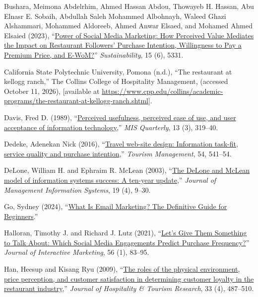\documentclass[
  12pt,
  letterpaper,
  DIV=11,
  numbers=noendperiod]{scrartcl}
\newlength{\cslhangindent}
\newenvironment{CSLReferences}[2] %
 {\begin{list}{}{%
  \setlength{\itemindent}{0pt}
  \setlength{\leftmargin}{0pt}
  \setlength{\parsep}{0pt}
  \ifodd #1
   \setlength{\leftmargin}{\cslhangindent}
   \setlength{\itemindent}{-1\cslhangindent}
  \fi
  \setlength{\itemsep}{#2\baselineskip}}}
 {\end{list}}
\begin{document}
\begin{CSLReferences}{1}{0}
Bushara, Meimona Abdelrhim, Ahmed Hassan Abdou, Thowayeb H. Hassan, Abu
Elnasr E. Sobaih, Abdullah Saleh Mohammed Albohnayh, Waleed Ghazi
Alshammari, Mohammed Aldoreeb, Ahmed Anwar Elsaed, and Mohamed Ahmed
Elsaied (2023), {``\href{https://doi.org/10.3390/su15065331}{Power of
Social Media Marketing: How Perceived Value Mediates the Impact on
Restaurant Followers{'} Purchase Intention, Willingness to Pay a Premium
Price, and E-WoM?}''} \emph{Sustainability}, 15 (6), 5331.

California State Polytechnic University, Pomona (n.d.), {``The
restaurant at kellogg ranch,''} The Collins College of Hospitality
Management, (accessed October 11, 2026), {[}available at
\url{https://www.cpp.edu/collins/academic-programs/the-restaurant-at-kellogg-ranch.shtml}{]}.

Davis, Fred D. (1989),
{``\href{https://doi.org/10.2307/249008}{Perceived usefulness, perceived
ease of use, and user acceptance of information technology},''}
\emph{MIS Quarterly}, 13 (3), 319--40.

Dedeke, Adenekan Nick (2016),
{``\href{https://doi.org/10.1016/j.tourman.2016.01.001}{Travel web-site
design: Information task-fit, service quality and purchase
intention},''} \emph{Tourism Management}, 54, 541--54.

DeLone, William H. and Ephraim R. McLean (2003),
{``\href{https://doi.org/10.1080/07421222.2003.11045748}{The {DeLone}
and {McLean} model of information systems success: A ten-year
update},''} \emph{Journal of Management Information Systems}, 19 (4),
9--30.

Go, Sydney (2024),
{``\href{https://www.semrush.com/blog/email-marketing}{What Is Email
Marketing? The Definitive Guide for Beginners}.''}

Halloran, Timothy J. and Richard J. Lutz (2021),
{``\href{https://doi.org/10.1016/j.intmar.2021.05.003}{Let's Give Them
Something to Talk About: Which Social Media Engagements Predict Purchase
Frequency?}''} \emph{Journal of Interactive Marketing}, 56 (1), 83--95.

Han, Heesup and Kisang Ryu (2009),
{``\href{https://doi.org/10.1177/1096348009344212}{The roles of the
physical environment, price perception, and customer satisfaction in
determining customer loyalty in the restaurant industry},''}
\emph{Journal of Hospitality \& Tourism Research}, 33 (4), 487--510.


\end{CSLReferences}
\end{document}
